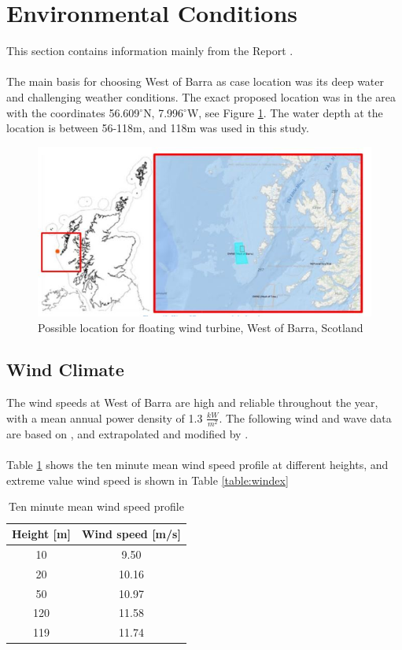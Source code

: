 \section{Environmental Conditions}
 This section contains information mainly from the Report \cite{Lifes50+D1.1}.\\\\ The main basis for choosing West of Barra as case location was its deep water and challenging weather conditions. The exact proposed location was in the area with the coordinates 56.609$^\circ$N, 7.996$^\circ$W, see Figure \ref{fig:wob}.  The water depth at the location is between 56-118m, and 118m was used in this study.


\begin{figure}[H]
\centering
\includegraphics[scale=0.8]{figures/wob}
\caption[$\; \:$West of Barra, Scotland]{Possible location for floating wind turbine, West of Barra, Scotland \cite{Lifes50+D1.1} }
 \label{fig:wob}
\end{figure}

\subsection{Wind Climate}
\label{sec:windcli}

The wind speeds at West of Barra are high and reliable throughout the year, with a mean annual power density of 1.3 $\frac{kW}{m^2}$. The following wind and wave data are based on \cite{geos2001}, and extrapolated and modified by \cite{Lifes50+D1.1}. 
\\\\
Table \ref{table:wind} shows the ten minute mean wind speed profile at different heights, and extreme value wind speed is shown in Table  \ref{table:windex}
\begin{table} [H]
\centering
\begin{tabular}{ |c|c|}
\hline
 Height [m]& Wind speed [m/s]\\
 \hline
 \hline
 10 & 9.50 \\

 20 & 10.16 \\
 
 50 & 10.97 \\
 
 120 & 11.58 \\

 119 & 11.74  \\
 \hline
\end{tabular}
\caption{Ten minute mean wind speed profile}
\label{table:wind}
\end{table}

